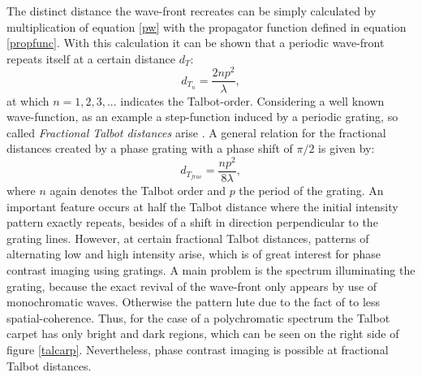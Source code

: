 The distinct distance the wave-front recreates can be simply calculated by multiplication of equation \ref{pw} with the propagator function defined in equation \ref{propfunc}. With this calculation it can be shown that a periodic wave-front repeats itself at a certain distance $d_{T}$:
\begin{equation}\label{taldist}
d_{T_{n}} = \frac{2np^{2}}{\lambda},
\end{equation}
at which $n = 1,2,3,...$ indicates the Talbot-order. Considering a well known wave-function, as an example a step-function induced by a periodic grating, so called \textit{Fractional Talbot distances} arise \cite{Bech2009}. A general relation for the fractional distances created by a phase grating with a phase shift of $\pi/2$ is given by:
\begin{equation}\label{fractal}
d_{T_{frac}} = \frac{n p^{2}}{8 \lambda},
\end{equation}
where $n$ again denotes the Talbot order and $p$ the period of the grating. 
An important feature occurs at half the Talbot distance where the initial intensity pattern exactly repeats, besides of a shift in direction perpendicular to the grating lines. However, at certain fractional Talbot distances, patterns of alternating low and high intensity arise, which is of great interest for phase contrast imaging using gratings. A main problem is the spectrum illuminating the grating, because the exact revival of the wave-front only appears by use of monochromatic waves. Otherwise the pattern lute due to the fact of to less spatial-coherence. Thus, for the case of a polychromatic spectrum the Talbot carpet has only bright and dark regions, which can be seen on the right side of figure \ref{talcarp}. Nevertheless, phase contrast imaging is possible at fractional Talbot distances.
